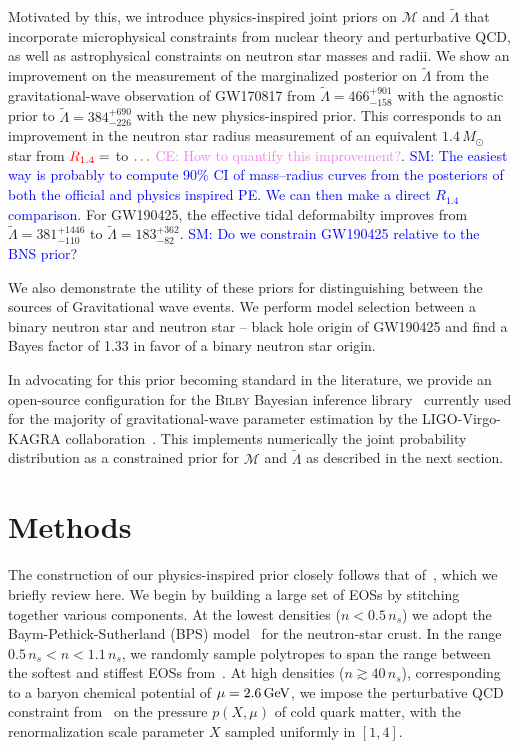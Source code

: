 \documentclass[twocolumn]{aastex631}
\newcommand{\red}[1]{\textcolor{red}{#1}}
\newcommand{\SM}[1]{\textcolor{blue}{SM: #1}}
\newcommand{\CE}[1]{\textcolor{violet}{CE: #1}}
\begin{document}
Motivated by this, we introduce physics-inspired joint priors on $\mathcal{M}$ and $\tilde{\Lambda}$ that incorporate microphysical constraints from nuclear theory and perturbative QCD, as well as astrophysical constraints on neutron star masses and radii.
We show an improvement on the measurement of the marginalized posterior on $\tilde{\Lambda}$ from the gravitational-wave observation of GW170817 from $\tilde{\Lambda}=466^{+901}_{-158}$ with the agnostic prior to $\tilde{\Lambda} = 384^{+690}_{-226}$ with the new physics-inspired prior.
This corresponds to an improvement in the neutron star radius measurement of an equivalent $1.4\,{M_\odot}$ star from $\red{R_{1.4}}= $ to $\red{\ldots}$ \CE{How to quantify this improvement?}. \SM{The easiest way is probably to compute 90\% CI of mass--radius curves from the posteriors of both the official and physics inspired PE. We can then make a direct $R_{1.4}$ comparison.}
For GW190425, the effective tidal deformabilty improves from $\tilde{\Lambda} = 381^{+1446}_{-110}$ to $\tilde{\Lambda} = 183^{+362}_{-82}$. \SM{Do we constrain GW190425 relative to the BNS prior?}
	
We also demonstrate the utility of these priors for distinguishing between the sources of Gravitational wave events. 
We perform model selection between a binary neutron star and neutron star -- black hole origin of GW190425 and find a Bayes factor of 1.33 in favor of a binary neutron star origin. 
	
In advocating for this prior becoming standard in the literature, we provide an open-source configuration for the \textsc{Bilby} Bayesian inference library~\citep{ashton19,romeroshaw20} currently used for the majority of gravitational-wave parameter estimation by the LIGO-Virgo-KAGRA collaboration~\citep{LIGO, Virgo, KAGRA}.
This implements numerically the joint probability distribution as a constrained prior for $\mathcal{M}$ and $\tilde{\Lambda}$ as described in the next section.
	
\section{Methods} \label{sec:Methods}
	
The construction of our physics-inspired prior closely follows that of~\citet{Altiparmak:2022}, which we briefly review here. 
We begin by building a large set of EOSs by stitching together various components.
At the lowest densities ($n<0.5\,n_s$) we adopt the Baym-Pethick-Sutherland (BPS) model~\citep{Baym71} for the neutron-star crust.
In the range $0.5\,n_s < n < 1.1\,n_s$, we randomly sample polytropes to span the range between the softest and stiffest EOSs from~\citet{Hebeler:2013nza}.
At high densities ($n \gtrsim 40\,n_s$), corresponding to a baryon chemical potential of $\mu = 2.6\,\rm GeV$, we impose the perturbative QCD constraint from~\citet{Fraga2014} on the pressure $p(X, \mu)$ of cold quark matter, with the renormalization scale parameter $X$ sampled uniformly in $[1,4]$.
	
\end{document}
